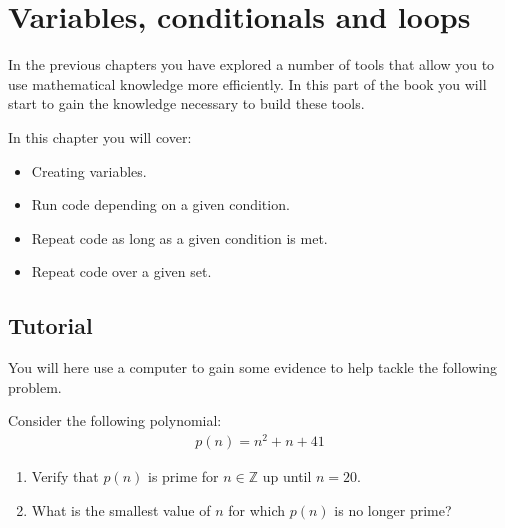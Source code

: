 \chapter{Variables, conditionals and loops}
\label{chp:variables_conditionals_and_loops}

In the previous chapters you have explored a number of tools that allow you to use
mathematical knowledge more efficiently. In this part of the book you will
start to gain the knowledge necessary to build these tools.



\begin{note}
In this chapter you will cover:
\begin{itemize}
\item 

Creating variables.

\item 

Run code depending on a given condition.

\item 

Repeat code as long as a given condition is met.

\item 

Repeat code over a given set.

\end{itemize}
\end{note}





\section{Tutorial}
\label{\detokenize{building-tools/01-variables-conditionals-loops/tutorial/main:tutorial}}\label{\detokenize{building-tools/01-variables-conditionals-loops/tutorial/main::doc}}

You will here use a computer to gain some evidence to help tackle the following
problem.




Consider the following polynomial:
\begin{equation*}
\begin{split}
    p(n) = n ^ 2 + n + 41
\end{split}
\end{equation*}\begin{enumerate}

\item 

Verify that \(p(n)\) is prime for \(n\in \mathbb{Z}\) up until \(n=20\).

\item 

What is the smallest value of \(n\) for which \(p(n)\) is no longer prime?

\end{enumerate}



